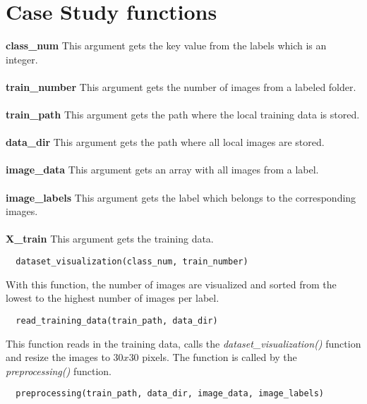 \section{Case Study functions}
\label{sec:case_study_functions}

\textbf{class\_num}
This argument gets the key value from the labels which is an integer. \\ \\
\textbf{train\_number}
This argument gets the number of images from a labeled folder. \\ \\
\textbf{train\_path}
This argument gets the path where the local training data is stored. \\ \\
\textbf{data\_dir}
This argument gets the path where all local images are stored. \\ \\
\textbf{image\_data}
This argument gets an array with all images from a label. \\ \\
\textbf{image\_labels}
This argument gets the label which belongs to the corresponding images. \\ \\
\textbf{X\_train}
This argument gets the training data. \\

\begin{lstlisting}
  dataset_visualization(class_num, train_number)
\end{lstlisting}

\noindent With this function, the number of images are visualized and sorted from the lowest to the highest number of images per label.

\begin{lstlisting}
  read_training_data(train_path, data_dir)
\end{lstlisting}

\noindent This function reads in the training data, calls the \textit{dataset\_visualization()} function and resize the images to $30x30$ pixels. The function is called by the \textit{preprocessing()} function.

\begin{lstlisting}
  preprocessing(train_path, data_dir, image_data, image_labels)
\end{lstlisting}

